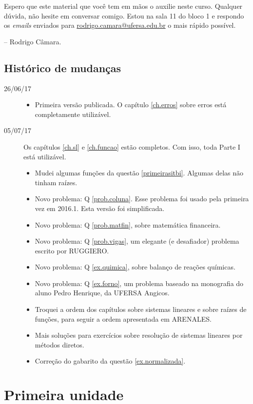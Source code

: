 \documentclass[10pt,a4paper]{report}
\theoremstyle{definition}
\begin{document}
Espero que este material que você tem em mãos o auxilie neste curso. Qualquer dúvida, não hesite em conversar comigo. Estou na sala 11 do bloco 1 e respondo os \emph{emails} enviados para \url{rodrigo.camara@ufersa.edu.br} o mais rápido possível.

\begin{flushright}
-- Rodrigo Câmara.
\end{flushright}
\chapter*{Histórico de mudanças}
\begin{description}
\item[26/06/17] \begin{itemize}
\item Primeira versão publicada. O capítulo \ref{ch.erros} sobre erros está completamente utilizável. 
\end{itemize}
\item[05/07/17] Os capítulos \ref{ch.sl} e \ref{ch.funcao} estão completos. Com isso, toda Parte I está utilizável.
\begin{itemize}
\item Mudei algumas funções da questão \ref{primeirasitbi}. Algumas delas não tinham raízes.
\item Novo problema: Q \ref{prob.coluna}. Esse problema foi usado pela primeira vez em 2016.1. Esta versão foi simplificada.
\item Novo problema: Q \ref{prob.matfin}, sobre matemática financeira.
\item Novo problema: Q \ref{prob.vigas}, um elegante (e desafiador) problema escrito por RUGGIERO.
\item Novo problema: Q \ref{ex.quimica}, sobre balanço de reações químicas.
\item Novo problema: Q \ref{ex.forno}, um problema baseado na monografia do aluno Pedro Henrique, da UFERSA Angicos.
\item Troquei a ordem dos capítulos sobre sistemas lineares e sobre raízes de funções, para seguir a ordem apresentada em ARENALES.
\item Mais soluções para exercícios sobre resolução de sistemas lineares por métodos diretos.
\item Correção do gabarito da questão \ref{ex.normalizada}.
\end{itemize}
\end{description}
\part{Primeira unidade}
\end{document}

